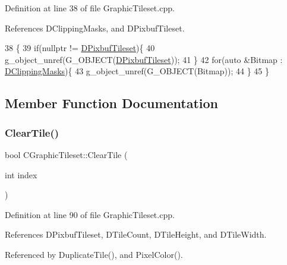 Definition at line 38 of file Graphic\+Tileset.\+cpp.



References D\+Clipping\+Masks, and D\+Pixbuf\+Tileset.


\begin{DoxyCode}
38                                  \{
39     \textcolor{keywordflow}{if}(\textcolor{keyword}{nullptr} != \hyperlink{classCGraphicTileset_a5d5adfcdbb347a6df3f57535ca08e3ef}{DPixbufTileset})\{
40         g\_object\_unref(G\_OBJECT(\hyperlink{classCGraphicTileset_a5d5adfcdbb347a6df3f57535ca08e3ef}{DPixbufTileset}));
41     \}
42     \textcolor{keywordflow}{for}(\textcolor{keyword}{auto} &Bitmap : \hyperlink{classCGraphicTileset_a3761aec1b9a8bf189da5a7202d7fcac9}{DClippingMasks})\{
43         g\_object\_unref(G\_OBJECT(Bitmap));
44     \}
45 \}
\end{DoxyCode}


\subsection{Member Function Documentation}
\hypertarget{classCGraphicTileset_aefeefc9e2ad01ceb8a781bd455859f76}{}\label{classCGraphicTileset_aefeefc9e2ad01ceb8a781bd455859f76} 
\subsubsection{\texorpdfstring{Clear\+Tile()}{ClearTile()}}
{\footnotesize\ttfamily bool C\+Graphic\+Tileset\+::\+Clear\+Tile (\begin{DoxyParamCaption}\item[{int}]{index }\end{DoxyParamCaption})}



Definition at line 90 of file Graphic\+Tileset.\+cpp.



References D\+Pixbuf\+Tileset, D\+Tile\+Count, D\+Tile\+Height, and D\+Tile\+Width.



Referenced by Duplicate\+Tile(), and Pixel\+Color().


